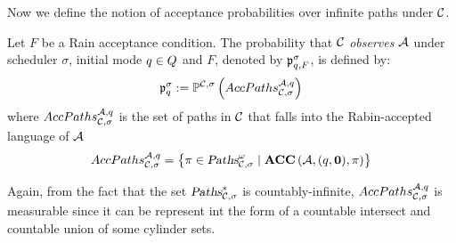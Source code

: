Now we define the notion of acceptance probabilities over infinite paths under $\mathcal{C}$.
\begin{definition}
Let $F$ be a Rain acceptance condition.
The probability that $\mathcal{C}$ \emph{observes} $\mathcal{A}$ under scheduler $\sigma$, initial mode $q\in Q$ and $F$, denoted by $\mathfrak{p}_{q,F}^{\sigma}$, is defined by:
\[
    \mathfrak{p}_{q}^{\sigma}
        :=
            \mathbb{P}^{\mathcal{C},\sigma}\left(
                AccPaths _{\mathcal{C},\sigma} ^{\mathcal{A},q}
            \right)
\]
where $AccPaths _{\mathcal{C},\sigma} ^{\mathcal{A},q}$ is the set of paths in $\mathcal{C}$ that falls into the Rabin-accepted language of $\mathcal{A}$
$$
    AccPaths _{\mathcal{C},\sigma} ^{\mathcal{A},q} = \left \{ 
        \pi \in \mbox{\sl Paths}^\omega_{\mathcal{C},\sigma} \mid 
        \mbox{\bf ACC} \left( {\mathcal{A}}, {(q,\mathbf{0})}, {\pi} \right)
    \right\}
$$
\end{definition}
Again, from the fact that the set $\mbox{\sl Paths}^*_{\mathcal{C},\sigma}$ is countably-infinite, 
$AccPaths _{\mathcal{C},\sigma} ^{\mathcal{A},q}$ is measurable since it can be represent int the 
form of a countable intersect and countable union of some cylinder sets.


